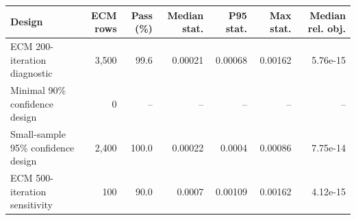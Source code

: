 \begin{tabular}{@{}lrrrrrr@{}}
\toprule
Design & ECM rows & Pass (\%) & Median stat. & P95 stat. & Max stat. & Median rel. obj.\\
\midrule
ECM 200-iteration diagnostic & 3,500 & 99.6 & 0.00021 & 0.00068 & 0.00162 & 5.76e-15 \\
Minimal 90\% confidence design & 0 & -- & -- & -- & -- & -- \\
Small-sample 95\% confidence design & 2,400 & 100.0 & 0.00022 & 0.0004 & 0.00086 & 7.75e-14 \\
ECM 500-iteration sensitivity & 100 & 90.0 & 0.0007 & 0.00109 & 0.00162 & 4.12e-15 \\
\bottomrule
\end{tabular}

